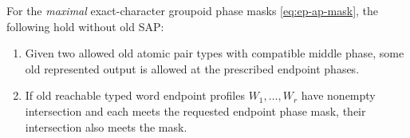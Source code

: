 \begin{lemma}
\label{lem:ep-ap-TP}
For the \emph{maximal} exact-character
groupoid phase masks \eqref{eq:ep-ap-mask},
the following hold without old SAP:
\begin{enumerate}[label=(\textup{\alph*}),leftmargin=*]
\item[(T)] Given two allowed old atomic
pair types with compatible middle phase,
some old represented output is allowed
at the prescribed endpoint phases.
\item[(P)] If old reachable typed word
endpoint profiles \(W_1,\ldots,W_r\)
have nonempty intersection and each
meets the requested endpoint phase mask,
their intersection also meets the mask.
\end{enumerate}
\end{lemma}
